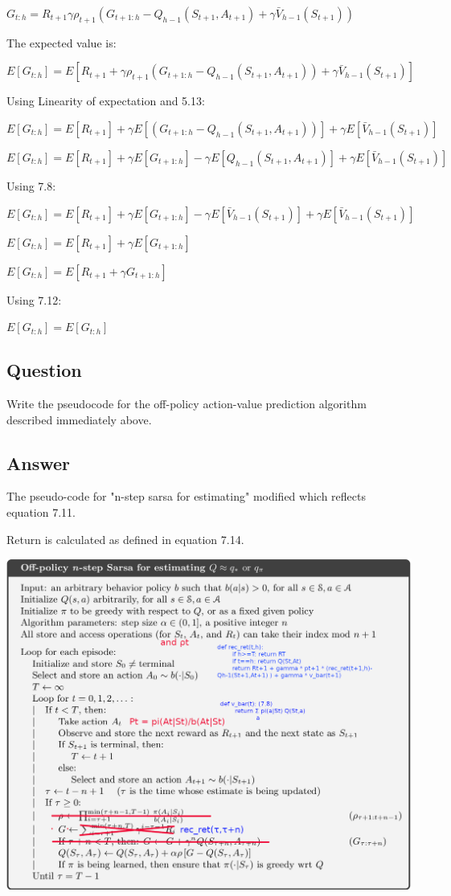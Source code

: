 \documentclass[11pt]{article}
\begin{document}
    \noindent $ G_{t:h} = R_{t+1} \gamma \rho_{t+1} ( G_{t+1:h} - Q_{h-1}(S_{t+1}, A_{t+1}) + \gamma \bar{V}_{h-1}(S_{t+1}) ) $

    \noindent The expected value is:

    \noindent $ E[G_{t:h}] = E [R_{t+1} + \gamma \rho_{t+1} ( G_{t+1:h} - Q_{h-1}(S_{t+1}, A_{t+1}) )+ \gamma \bar{V}_{h-1}(S_{t+1}) ] $

    \noindent Using Linearity of expectation and 5.13:

    \noindent $ E[G_{t:h}] = E [R_{t+1}] + \gamma E[( G_{t+1:h} - Q_{h-1}(S_{t+1}, A_{t+1}) )] + \gamma E[\bar{V}_{h-1}(S_{t+1})] $

    \noindent $ E[G_{t:h}] = E [R_{t+1}] + \gamma E[G_{t+1:h}] - \gamma E[Q_{h-1}(S_{t+1}, A_{t+1}) ] + \gamma E[\bar{V}_{h-1}(S_{t+1})] $

    \noindent Using 7.8:

    \noindent $ E[G_{t:h}] = E [R_{t+1}] + \gamma E[G_{t+1:h}] - \gamma E[\bar{V}_{h-1}(S_{t+1})] + \gamma E[\bar{V}_{h-1}(S_{t+1})] $

    \noindent $ E[G_{t:h}] = E [R_{t+1}] + \gamma E[G_{t+1:h}] $

    \noindent $ E[G_{t:h}] = E [R_{t+1} + \gamma G_{t+1:h}] $

    \noindent Using 7.12:

    \noindent $ E[G_{t:h}] = E[G_{t:h}] $


    \subsection{Question}

    Write the pseudocode for the off-policy action-value prediction algorithm described immediately above.

    \subsection*{Answer}

    The pseudo-code for "n-step sarsa for estimating" modified which reflects equation 7.11.

    Return is calculated as defined in equation 7.14.

    \includegraphics[scale=1]{figure_7_7}
\end{document}
